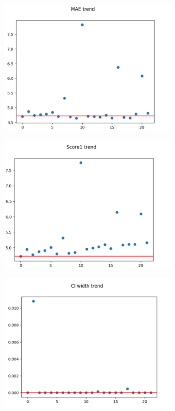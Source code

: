\documentclass[
	letterpaper,
	a4paper,
	cleardoublepage=empty,
	headings=twolinechapter,
	numbers=autoenddot,
]{article}
\begin{document}
	\begin{figure}[h]
		\centering
		\begin{subfigure}{.5\textwidth}
			\centering
			\includegraphics[width=0.7\linewidth]{ImageFiles/mape_bnn_mae}
			\caption{}
			\label{fig:mape_bnn_mae}
		\end{subfigure}%
		\begin{subfigure}{.5\textwidth}
			\centering
			\includegraphics[width=0.7\linewidth]{ImageFiles/mape_bnn_eff1}
			\caption{}
			\label{fig:mape_bnn_eff1}
		\end{subfigure}
		\begin{subfigure}{.5\textwidth}
			\centering
			\includegraphics[width=0.7\linewidth]{ImageFiles/mape_bnn_ci}

\end{subfigure}
\end{figure}
\end{document}
